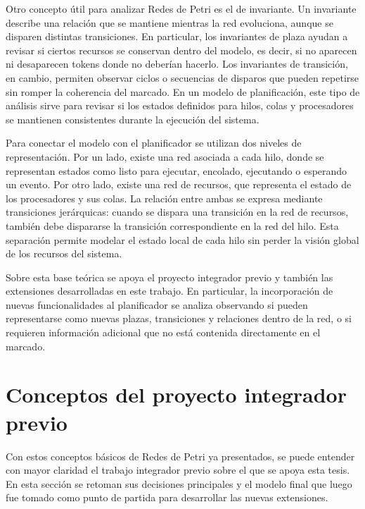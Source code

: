 Otro concepto útil para analizar Redes de Petri es el de invariante. Un invariante describe una relación que se mantiene mientras la red evoluciona, aunque se disparen distintas transiciones. En particular, los invariantes de plaza ayudan a revisar si ciertos recursos se conservan dentro del modelo, es decir, si no aparecen ni desaparecen tokens donde no deberían hacerlo. Los invariantes de transición, en cambio, permiten observar ciclos o secuencias de disparos que pueden repetirse sin romper la coherencia del marcado. En un modelo de planificación, este tipo de análisis sirve para revisar si los estados definidos para hilos, colas y procesadores se mantienen consistentes durante la ejecución del sistema\cite{bib7}.\par

Para conectar el modelo con el planificador se utilizan dos niveles de representación. Por un lado, existe una red asociada a cada hilo, donde se representan estados como listo para ejecutar, encolado, ejecutando o esperando un evento. Por otro lado, existe una red de recursos, que representa el estado de los procesadores y sus colas. La relación entre ambas se expresa mediante transiciones jerárquicas: cuando se dispara una transición en la red de recursos, también debe dispararse la transición correspondiente en la red del hilo. Esta separación permite modelar el estado local de cada hilo sin perder la visión global de los recursos del sistema.\par

Sobre esta base teórica se apoya el proyecto integrador previo y también las extensiones desarrolladas en este trabajo. En particular, la incorporación de nuevas funcionalidades al planificador se analiza observando si pueden representarse como nuevas plazas, transiciones y relaciones dentro de la red, o si requieren información adicional que no está contenida directamente en el marcado.\par

\section{Conceptos del proyecto integrador previo}

Con estos conceptos básicos de Redes de Petri ya presentados, se puede entender con mayor claridad el trabajo integrador previo sobre el que se apoya esta tesis. En esta sección se retoman sus decisiones principales y el modelo final que luego fue tomado como punto de partida para desarrollar las nuevas extensiones.\par

